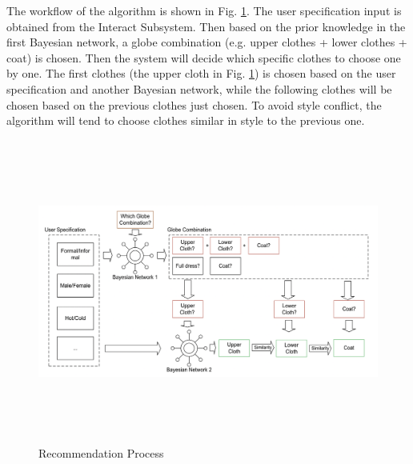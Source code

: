 The workflow of the algorithm is shown in Fig. \ref{RecommendationProcess}. The user specification input is obtained from the Interact Subsystem. Then based on the prior knowledge in the first Bayesian network, a globe combination (e.g. upper clothes + lower clothes + coat) is chosen. Then the system will decide which specific clothes to choose one by one. The first clothes (the upper cloth in Fig. \ref{RecommendationProcess}) is chosen based on the user specification and another Bayesian network, while the following clothes will be chosen based on the previous clothes just chosen. To avoid style conflict, the algorithm will tend to choose clothes similar in style to the previous one.
\begin{figure}[h]
   \centering
   \includegraphics[width=16cm,height=10cm]{graph/recommendationDiagram.png}
   \caption{Recommendation Process}
   \label{RecommendationProcess}
   \end{figure}


